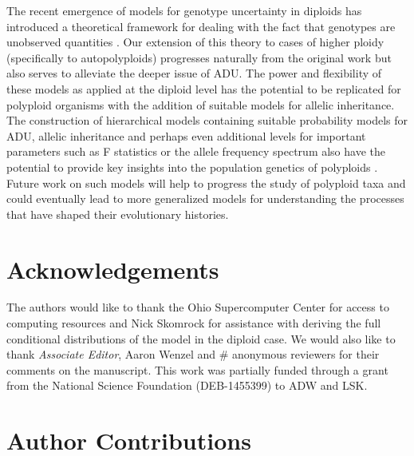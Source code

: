 \documentclass[11pt,english,letterpaper,oneside]{article}
\begin{document}
The recent emergence of models for genotype uncertainty in diploids has introduced a theoretical framework for dealing with the fact that genotypes are unobserved quantities \citep{gompert2012bgc,buerkle2013popModels}. Our extension of this theory to cases of higher ploidy (specifically to autopolyploids) progresses naturally from the original work but also serves to alleviate the deeper issue of ADU. The power and flexibility of these models as applied at the diploid level has the potential to be replicated for polyploid organisms with the addition of suitable models for allelic inheritance. The construction of hierarchical models containing suitable probability models for ADU, allelic inheritance and perhaps even additional levels for important parameters such as F statistics or the allele frequency spectrum also have the potential to provide key insights into the population genetics of polyploids \citep{gompert2011bamova,buerkle2013popModels}. Future work on such models will help to progress the study of polyploid taxa and could eventually lead to more generalized models for understanding the processes that have shaped their evolutionary histories.
\medskip

\section*{Acknowledgements}           %

The authors would like to thank the Ohio Supercomputer Center for access to computing resources and Nick Skomrock for assistance with deriving the full conditional distributions of the model in the diploid case. We would also like to thank \textit{Associate Editor}, Aaron Wenzel and \# anonymous reviewers for their comments on the manuscript. This work was partially funded through a grant from the National Science Foundation (DEB-1455399) to ADW and LSK.
\bigskip



\singlespacing





\section*{Author Contributions}        %
\end{document}
